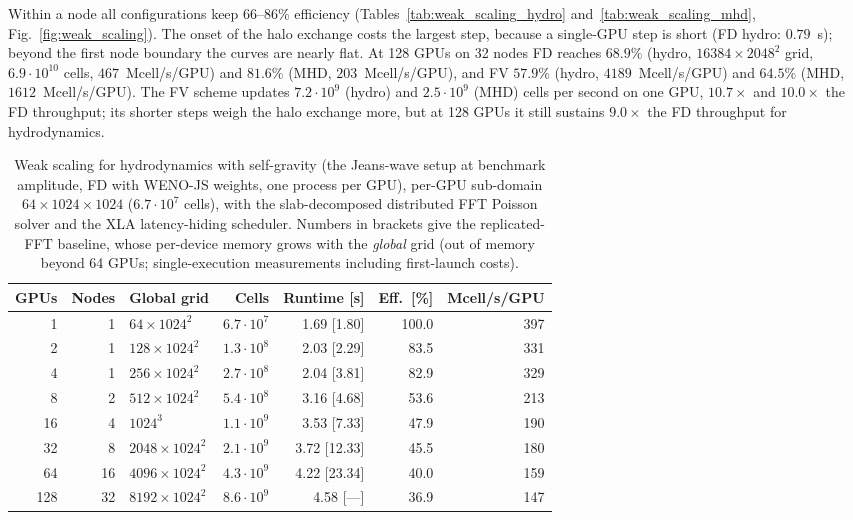 Within a node all configurations keep $66$--$86\%$ efficiency
(Tables~\ref{tab:weak_scaling_hydro} and~\ref{tab:weak_scaling_mhd},
Fig.~\ref{fig:weak_scaling}).  The onset of the halo exchange costs the
largest step, because a single-GPU step is short (FD hydro: $0.79$~s);
beyond the first node boundary the curves are nearly flat.  At 128 GPUs on 32 nodes FD reaches $68.9\%$ (hydro,
$16384\times2048^{2}$ grid, $6.9\cdot10^{10}$ cells, $467$~Mcell/s/GPU) and
$81.6\%$ (MHD, $203$~Mcell/s/GPU), and FV $57.9\%$ (hydro, $4189$~Mcell/s/GPU) and
$64.5\%$ (MHD, $1612$~Mcell/s/GPU).  The FV scheme updates
$7.2\cdot10^{9}$ (hydro) and $2.5\cdot10^{9}$ (MHD) cells per second on
one GPU, $10.7\times$ and $10.0\times$ the FD throughput; its shorter steps
weigh the halo exchange more, but at 128 GPUs it still sustains
$9.0\times$ the FD throughput for hydrodynamics.

\begin{table}
    \centering
    \caption{Weak scaling for hydrodynamics with self-gravity (the
    Jeans-wave setup at benchmark amplitude, FD with WENO-JS weights, one
    process per GPU), per-GPU sub-domain $64\times1024\times1024$
    ($6.7\cdot10^{7}$ cells), with the slab-decomposed distributed FFT
    Poisson solver and the XLA latency-hiding scheduler.  Numbers in
    brackets give the replicated-FFT baseline, whose per-device memory
    grows with the \emph{global} grid (out of memory beyond 64 GPUs;
    single-execution measurements including first-launch costs).}
    \label{tab:weak_scaling_selfgrav}
    \begin{tabular}{rrlrrrr}
        \toprule
        GPUs & Nodes & Global grid & Cells & Runtime [s] & Eff.\ [\%] & Mcell/s/GPU \\
        \midrule
        1 & 1 & $64\times1024^{2}$ & $6.7\cdot10^{7}$ & 1.69 [1.80] & 100.0 & 397 \\
        2 & 1 & $128\times1024^{2}$ & $1.3\cdot10^{8}$ & 2.03 [2.29] & 83.5 & 331 \\
        4 & 1 & $256\times1024^{2}$ & $2.7\cdot10^{8}$ & 2.04 [3.81] & 82.9 & 329 \\
        8 & 2 & $512\times1024^{2}$ & $5.4\cdot10^{8}$ & 3.16 [4.68] & 53.6 & 213 \\
        16 & 4 & $1024^{3}$ & $1.1\cdot10^{9}$ & 3.53 [7.33] & 47.9 & 190 \\
        32 & 8 & $2048\times1024^{2}$ & $2.1\cdot10^{9}$ & 3.72 [12.33] & 45.5 & 180 \\
        64 & 16 & $4096\times1024^{2}$ & $4.3\cdot10^{9}$ & 4.22 [23.34] & 40.0 & 159 \\
        128 & 32 & $8192\times1024^{2}$ & $8.6\cdot10^{9}$ & 4.58 [---] & 36.9 & 147 \\
        \bottomrule
    \end{tabular}
\end{table}

